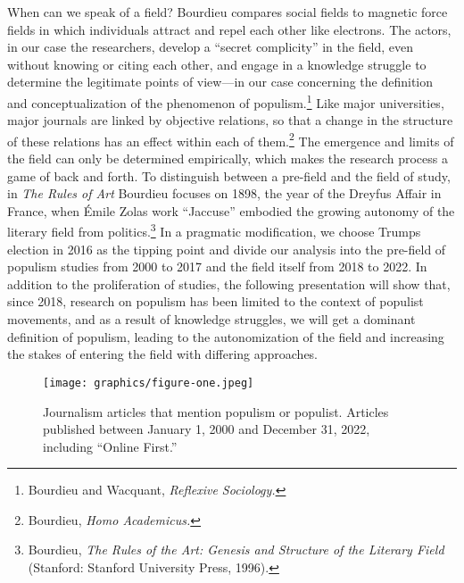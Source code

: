 \documentclass{tufte-handout}
\begin{document}
When can we speak of a field? Bourdieu compares social fields to
magnetic force fields in which individuals attract and repel each other
like electrons. The actors, in our case the researchers, develop a
``secret complicity'' in the field, even without knowing or citing each
other, and engage in a knowledge struggle to determine the legitimate
points of view---in our case concerning the definition and
conceptualization of the phenomenon of populism.\footnote{Bourdieu and
  Wacquant, \emph{Reflexive Sociology.}} Like major universities, major
journals are linked by objective relations, so that a change in the
structure of these relations has an effect within each of
them.\footnote{Bourdieu, \emph{Homo Academicus.}} The emergence and
limits of the field can only be determined empirically, which makes the
research process a game of back and forth. To distinguish between a
pre-field and the field of study, in \emph{The Rules of Art} Bourdieu
focuses on 1898, the year of the Dreyfus Affair in France, when Émile
Zola\textquotesingle s work ``J\textquotesingle accuse'' embodied the
growing autonomy of the literary field from politics.\footnote{Bourdieu,
  \emph{The Rules of the Art: Genesis and Structure of the Literary
  Field} (Stanford: Stanford University Press, 1996).} In a pragmatic
modification, we choose Trump\textquotesingle s election in 2016 as the
tipping point and divide our analysis into the pre-field of populism
studies from 2000 to 2017 and the field itself from 2018 to 2022. In
addition to the proliferation of studies, the following presentation
will show that, since 2018, research on populism has been limited to the
context of populist movements, and as a result of knowledge struggles,
we will get a dominant definition of populism, leading to the
autonomization of the field and increasing the stakes of entering the
field with differing approaches.

\vspace{2em}

\begin{figure}
    \centering
    \texttt{[image: graphics/figure-one.jpeg]}
    \caption{Journalism articles that mention populism or populist. Articles published between January 1, 2000 and December 31, 2022,
including ``Online First.''}
    \label{fig:one}
\end{figure}

\vspace{.2em}
\end{document}
